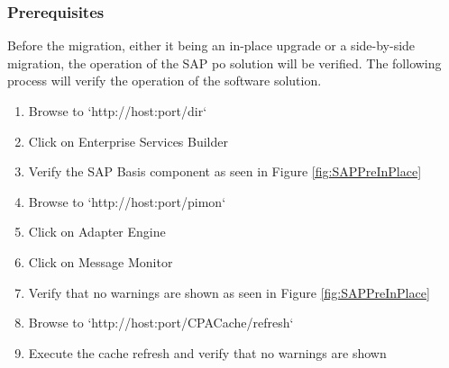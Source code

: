 \subsubsection{Prerequisites}
\label{sssec:SAP_Prerequisites}
Before the migration, either it being an in-place upgrade or a side-by-side migration, the operation of the SAP \acrshort{po} solution will be verified.  
The following process will verify the operation of the software solution.

\begin{enumerate}
    \item Browse to `http://host:port/dir`
    \item Click on Enterprise Services Builder
    \item Verify the SAP Basis component as seen in Figure \ref{fig:SAPPreInPlace}
    \item Browse to `http://host:port/pimon`
    \item Click on Adapter Engine
    \item Click on Message Monitor
    \item Verify that no warnings are shown as seen in Figure \ref{fig:SAPPreInPlace}
    \item Browse to `http://host:port/CPACache/refresh`
    \item Execute the cache refresh and verify that no warnings are shown
\end{enumerate}

